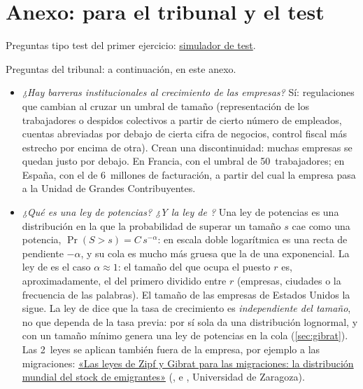 \documentclass[11pt]{article}
\begin{document}
\section{Anexo: para el tribunal y el test}\label{anexo:test}

\begin{anotaciones}
Preguntas tipo test del primer ejercicio: \href{https://www.victorgutierrezmarcos.es/oposicion/temario/primer-ejercicio/test/simulador.html?tema=3.B.4}{simulador de test}.

Preguntas del tribunal: a continuación, en este anexo.
\end{anotaciones}

\begin{itemize}
\item \emph{¿Hay barreras institucionales al crecimiento de las empresas?} Sí: regulaciones que cambian al cruzar un umbral de tamaño (representación de los trabajadores o despidos colectivos a partir de cierto número de empleados, cuentas abreviadas por debajo de cierta cifra de negocios, control fiscal más estrecho por encima de otra). Crean una discontinuidad: muchas empresas se quedan justo por debajo. En Francia, con el umbral de 50~trabajadores\nocite{GaricanoLelargeVanReenen2016Firm}; en España, con el de 6~millones de facturación, a partir del cual la empresa pasa a la Unidad de Grandes Contribuyentes\nocite{AlmuniaLopezRodriguez2018Under}.
\item \emph{¿Qué es una ley de potencias? ¿Y la ley de ?} Una ley de potencias es una distribución en la que la probabilidad de superar un tamaño $s$ cae como una potencia, $\Pr(S>s)=C\,s^{-\alpha}$: en escala doble logarítmica es una recta de pendiente $-\alpha$, y su cola es mucho más gruesa que la de una exponencial. La ley de  es el caso $\alpha\approx1$: el tamaño del que ocupa el puesto $r$ es, aproximadamente, el del primero dividido entre $r$ (empresas, ciudades o la frecuencia de las palabras). El tamaño de las empresas de Estados Unidos la sigue\nocite{Axtell2001Zipf}. La ley de  dice que la tasa de crecimiento es \emph{independiente del tamaño}, no que dependa de la tasa previa: por sí sola da una distribución lognormal, y con un tamaño mínimo genera una ley de potencias en la cola\nocite{Gabaix1999Zipf} (\ref{sec:gibrat}). Las 2~leyes se aplican también fuera de la empresa, por ejemplo a las migraciones: \href{https://aeet-aede.ulpgc.es/Descargas/Sesion3Sala2/Clemente-Gonzalez-Olloqui.pdf}{«Las leyes de Zipf y Gibrat para las migraciones: la distribución mundial del stock de emigrantes»} (,  e , Universidad de Zaragoza).

\end{itemize}
\end{document}
